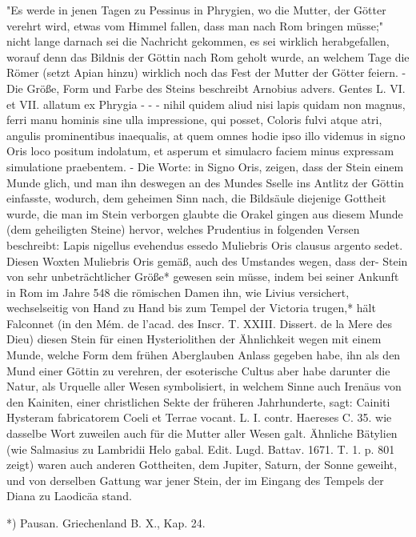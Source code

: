 \documentclass[a4paper, 11pt, oneside, polutonikogreek, german]{article}
\begin{document}
"Es werde in jenen Tagen zu Pessinus in Phrygien, wo die Mutter, der Götter verehrt wird, etwas vom Himmel fallen, dass man nach Rom bringen müsse;" nicht lange darnach sei die Nachricht gekommen, es sei wirklich herabgefallen, worauf denn das Bildnis der Göttin nach Rom geholt wurde, an welchem Tage die Römer (setzt Apian hinzu) wirklich noch das Fest der Mutter der Götter feiern. - Die Größe, Form und Farbe des Steins beschreibt Arnobius advers. Gentes L. VI. et VII. allatum ex Phrygia - - - nihil quidem aliud nisi lapis quidam non magnus, ferri manu hominis sine ulla impressione, qui posset, Coloris fulvi atque atri, angulis prominentibus inaequalis, at quem omnes hodie ipso illo videmus in signo Oris loco positum indolatum, et asperum et simulacro faciem minus expressam simulatione praebentem. - Die Worte: in Signo Oris, zeigen, dass der Stein einem Munde glich, und man ihn deswegen an des Mundes Sselle ins Antlitz der Göttin einfasste, wodurch, dem geheimen Sinn nach, die Bildsäule diejenige Gottheit wurde, die man im Stein verborgen glaubte die Orakel gingen aus diesem Munde (dem geheiligten Steine) hervor, welches Prudentius in folgenden Versen beschreibt: Lapis nigellus evehendus essedo Muliebris Oris clausus argento sedet. Diesen Woxten Muliebris Oris gemäß, auch des Umstandes wegen, dass der- Stein von sehr unbeträchtlicher Größe* gewesen sein müsse, indem bei seiner Ankunft in Rom im Jahre 548 die römischen Damen ihn, wie Livius versichert, wechselseitig von Hand zu Hand bis zum Tempel der Victoria trugen,* hält Falconnet (in den Mém. de l'acad. des Inscr. T. XXIII. Dissert. de la Mere des Dieu) diesen Stein für einen Hysteriolithen der Ähnlichkeit wegen mit einem Munde, welche Form dem frühen Aberglauben Anlass gegeben habe, ihn als den Mund einer Göttin zu verehren, der esoterische Cultus aber habe darunter die Natur, als Urquelle aller Wesen symbolisiert, in welchem Sinne auch Irenäus von den Kainiten, einer christlichen Sekte der früheren Jahrhunderte, sagt: Cainiti Hysteram fabricatorem Coeli et Terrae vocant. L. I. contr. Haereses C. 35. wie dasselbe Wort zuweilen auch für die Mutter aller Wesen galt. Ähnliche Bätylien (wie Salmasius zu Lambridii Helo gabal. Edit. Lugd. Battav. 1671. T. 1. p. 801 zeigt) waren auch anderen Gottheiten, dem Jupiter, Saturn, der Sonne geweiht, und von derselben Gattung war jener Stein, der im Eingang des Tempels der Diana zu Laodicäa stand.

*) Pausan. Griechenland B. X., Kap. 24.
\end{document}

